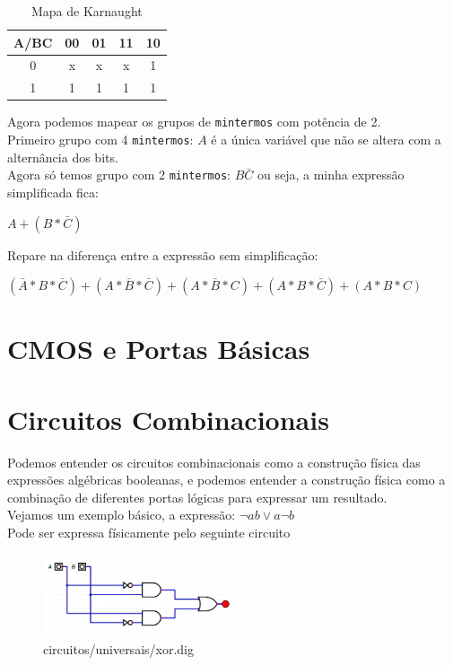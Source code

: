 \documentclass[12pt, onecolumn]{article}
\begin{document}
	\begin{table}[h]
		\centering
		\begin{tabular}{|c|c|c|c|c|}
			\hline
			A/BC & 00 & 01 & 11 & 10 \\ \hline
			0 & x & x & x & 1 \\ \hline
			1 & 1 & 1 & 1 & 1 \\ \hline
		\end{tabular}
		\caption{Mapa de Karnaught}
	\end{table}
	Agora podemos mapear os grupos de \texttt{mintermos} com potência de 2. \\
	\newline
	Primeiro grupo com 4 \texttt{mintermos}: $A$ é a única variável que não se 
	altera com a alternância dos bits. \\
	\newline
	Agora só temos grupo com 2 \texttt{mintermos}: $B\bar{C}$ ou seja, 
	a minha expressão simplificada fica: 
	\begin{center}
		$A + (B * \bar{C})$
	\end{center}
	Repare na diferença entre a expressão sem simplificação: 
	\begin{center}
		$
		(\bar{A}*B*\bar{C}) + (A*\bar{B}*\bar{C}) +
		(A*\bar{B}*C) + (A*B*\bar{C}) + (A*B*C)
		$
	\end{center}

	\section{\centering CMOS e Portas Básicas}
	
	\section{\centering Circuitos Combinacionais}

	Podemos entender os circuitos combinacionais como a construção
	física das expressões algébricas booleanas, e podemos entender
	a construção física como a combinação de diferentes portas 
	lógicas para expressar um resultado. \\
	\newline
	Vejamos um exemplo básico, a expressão: $\lnot{a}b \lor a\lnot{b}$ \\
	\newline
	Pode ser expressa físicamente pelo seguinte circuito
	\begin{figure}[h]
		\centering
		\caption{circuitos/universais/xor.dig}
		\includegraphics[width=0.5\textwidth]{img/cuircuito-xor.png}
	\end{figure}
\end{document}
